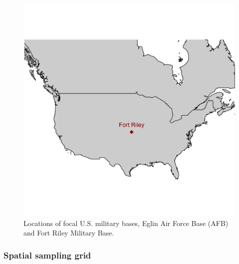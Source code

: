 \documentclass[12pt,twoside,openany]{reedthesis}
\begin{document}
\begin{figure}

{\centering \includegraphics[width=0.85\linewidth]{./chapterFiles/fisherSpatial/figures/figsCalledInDiss/basesOfInterestMap} 

}

\caption{Locations of focal U.S. military bases, Eglin Air Force Base (AFB) and Fort Riley Military Base.}\label{fig:basesOfInterestMap}
\end{figure}
\hypertarget{spatial-sampling-grid}{%
\subsubsection{Spatial sampling grid}\label{spatial-sampling-grid}}
\end{document}
